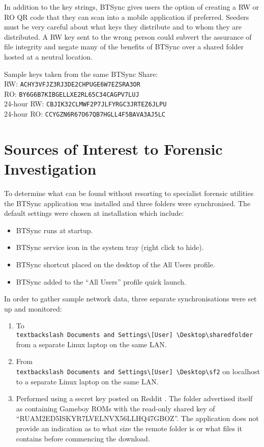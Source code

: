 \documentclass[final,5p,times,twocolumn]{elsarticle}
\begin{document}
In addition to the key strings, BTSync gives users the option of creating a RW or RO QR code that they can scan into a mobile application if preferred. Seeders must be very careful about what keys they distribute and to whom they are distributed. A RW key sent to the wrong person could subvert the assurance of file integrity and negate many of the benefits of BTSync over a shared folder hosted at a neutral location. 

Sample keys taken from the same BTSync Share:\\
RW: \texttt{ACHY3VFJZ3RJ3DE2CHPUGE6W7EZSRA3OR}\\
RO: \texttt{BY6G6B7KIBGELLXE2RL65C34CAGPV7LUJ}\\
24-hour RW: \texttt{CBJIK32CLMWF2P7JLFYRGC3JRTEZ6JLPU}\\
24-hour RO: \texttt{CCYGZN6R67O67QB7HGLL4F5BAVA3AJ5LC}

\section{Sources of Interest to Forensic Investigation}
\label{sources}
To determine what can be found without resorting to specialist forensic utilities the BTSync application was installed and three folders were synchronised. The default settings were chosen at installation which include:
\begin{itemize}
\item BTSync runs at startup.
\item BTSync service icon in the system tray (right click to hide).
\item BTSync shortcut placed on the desktop of the All Users profile.
\item BTSync added to the ``All Users'' profile quick launch.
\end{itemize}

In order to gather sample network data, three separate synchronisations were set up and monitored:
\begin{enumerate}
\item To \texttt{\\textbackslash Documents and Settings\textbackslash [User] \textbackslash Desktop\textbackslash sharedfolder} from a separate Linux laptop on the same LAN.
\item From \texttt{\\textbackslash Documents and Settings\textbackslash [User] \textbackslash Desktop\textbackslash sf2} on localhost to a separate Linux laptop on the same LAN.
\item Performed using a secret key posted on Reddit \cite{reddit}. The folder advertised itself as containing Gameboy ROMs with the read-only shared key of ``RUAM2ED5ISKYR7LVELNVX56LLHQ47GBOZ''. The application does not provide an indication as to what size the remote folder is or what files it contains before commencing the download.
\end{enumerate}
\end{document}
